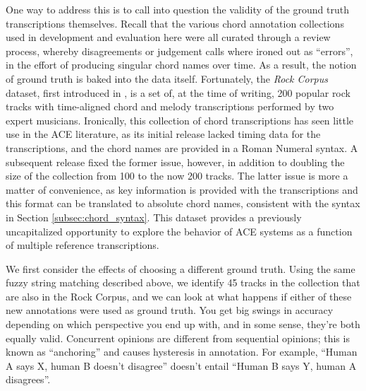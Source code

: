 One way to address this is to call into question the validity of the ground truth transcriptions themselves.
Recall that the various chord annotation collections used in development and evaluation here were all curated through a review process, whereby disagreements or judgement calls where ironed out as ``errors'', in the effort of producing singular chord names over time.
As a result, the notion of ground truth is baked into the data itself.
Fortunately, the \emph{Rock Corpus} dataset, first introduced in \cite{deClerqc2010}, is a set of, at the time of writing, 200 popular rock tracks with time-aligned chord and melody transcriptions performed by two expert musicians.
Ironically, this collection of chord transcriptions has seen little use in the ACE literature, as its initial release lacked timing data for the transcriptions, and the chord names are provided in a Roman Numeral syntax.
A subsequent release fixed the former issue, however, in addition to doubling the size of the collection from 100 to the now 200 tracks.
The latter issue is more a matter of convenience, as key information is provided with the transcriptions and this format can be translated to absolute chord names, consistent with the syntax in Section \ref{subsec:chord_syntax}.
This dataset provides a previously uncapitalized opportunity to explore the behavior of ACE systems as a function of multiple reference transcriptions.

We first consider the effects of choosing a different ground truth.
Using the same fuzzy string matching described above, we identify 45 tracks in the collection that are also in the Rock Corpus, and we can look at what happens if either of these new annotations were used as ground truth.
You get big swings in accuracy depending on which perspective you end up with, and in some sense, they're both equally valid.
Concurrent opinions are different from sequential opinions; this is known as ``anchoring'' and causes hysteresis in annotation.
For example, ``Human A says X, human B doesn't disagree'' doesn't entail ``Human B says Y, human A disagrees''.

%
%








